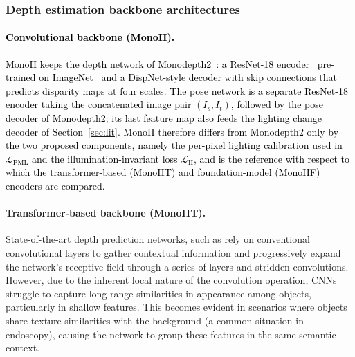 \documentclass[a4paper,fleqn]{cas-dc}
\begin{document}
{\subsubsection{Depth estimation backbone architectures  \label{sec:Architectures}} 
%
\textcolor{black}{\paragraph{Convolutional backbone (MonoII).} MonoII keeps the depth network of Monodepth2~\citep{Godard_ICCV_2019}: a ResNet-18 encoder~\citep{He_CVPR_2016} pre-trained on ImageNet~\citep{Deng_CVPR_2009} and a DispNet-style decoder with skip connections that predicts disparity maps at four scales. The pose network is a separate ResNet-18 encoder taking the concatenated image pair $(I_s, I_t)$, followed by the pose decoder of Monodepth2; its last feature map also feeds the lighting change decoder of Section~\ref{sec:lit}. MonoII therefore differs from Monodepth2 only by the two proposed components, namely the per-pixel lighting calibration used in $\mathcal{L}_\textrm{PML}$ and the illumination-invariant loss $\mathcal{L}_\textrm{II}$, and is the reference with respect to which the transformer-based (MonoIIT) and foundation-model (MonoIIF) encoders are compared.}
%
\paragraph{Transformer-based backbone (MonoIIT).}
State-of-the-art depth prediction networks, such as \citep{Godard_ICCV_2019,Ozyoruk_MIA_2021,Shao_MIA_2022} rely on conventional convolutional layers to gather contextual information and progressively expand the network's receptive field through a series of layers and stridden convolutions. However, due to the inherent local nature of the convolution operation, CNNs struggle to capture long-range similarities in appearance among objects, particularly in shallow features. This becomes evident in scenarios where objects share texture similarities with the background (a common situation in endoscopy), causing the network to group these features in the same semantic context. 

}
\end{document}
